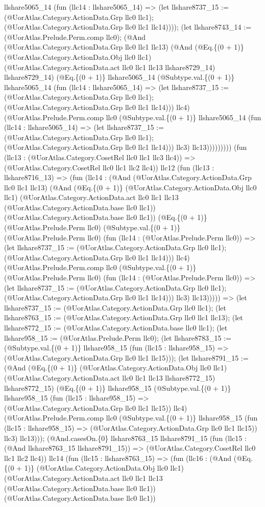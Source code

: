 \documentclass[11pt]{article}
\begin{document}
llshare5065\_14 (fun (llc14 : llshare5065\_14) => (let llshare8737\_15 := (@UorAtlas.Category.ActionData.Grp llc0 llc1); (@UorAtlas.Category.ActionData.Grp llc0 llc1 llc14)))); (let llshare8743\_14 := (@UorAtlas.Prelude.Perm.comp llc0); (@And (@UorAtlas.Category.ActionData.Grp llc0 llc1 llc13) (@And (@Eq.\{(0 + 1)\} (@UorAtlas.Category.ActionData.Obj llc0 llc1) (@UorAtlas.Category.ActionData.act llc0 llc1 llc13 llshare8729\_14) llshare8729\_14) (@Eq.\{(0 + 1)\} llshare5065\_14 (@Subtype.val.\{(0 + 1)\} llshare5065\_14 (fun (llc14 : llshare5065\_14) => (let llshare8737\_15 := (@UorAtlas.Category.ActionData.Grp llc0 llc1); (@UorAtlas.Category.ActionData.Grp llc0 llc1 llc14))) llc4) (@UorAtlas.Prelude.Perm.comp llc0 (@Subtype.val.\{(0 + 1)\} llshare5065\_14 (fun (llc14 : llshare5065\_14) => (let llshare8737\_15 := (@UorAtlas.Category.ActionData.Grp llc0 llc1); (@UorAtlas.Category.ActionData.Grp llc0 llc1 llc14))) llc3) llc13))))))))) (fun (llc13 : (@UorAtlas.Category.CosetRel llc0 llc1 llc3 llc4)) => (@UorAtlas.Category.CosetRel llc0 llc1 llc2 llc4)) llc12 (fun (llc13 : llshare8716\_13) => (fun (llc14 : (@And (@UorAtlas.Category.ActionData.Grp llc0 llc1 llc13) (@And (@Eq.\{(0 + 1)\} (@UorAtlas.Category.ActionData.Obj llc0 llc1) (@UorAtlas.Category.ActionData.act llc0 llc1 llc13 (@UorAtlas.Category.ActionData.base llc0 llc1)) (@UorAtlas.Category.ActionData.base llc0 llc1)) (@Eq.\{(0 + 1)\} (@UorAtlas.Prelude.Perm llc0) (@Subtype.val.\{(0 + 1)\} (@UorAtlas.Prelude.Perm llc0) (fun (llc14 : (@UorAtlas.Prelude.Perm llc0)) => (let llshare8737\_15 := (@UorAtlas.Category.ActionData.Grp llc0 llc1); (@UorAtlas.Category.ActionData.Grp llc0 llc1 llc14))) llc4) (@UorAtlas.Prelude.Perm.comp llc0 (@Subtype.val.\{(0 + 1)\} (@UorAtlas.Prelude.Perm llc0) (fun (llc14 : (@UorAtlas.Prelude.Perm llc0)) => (let llshare8737\_15 := (@UorAtlas.Category.ActionData.Grp llc0 llc1); (@UorAtlas.Category.ActionData.Grp llc0 llc1 llc14))) llc3) llc13))))) => (let llshare8737\_15 := (@UorAtlas.Category.ActionData.Grp llc0 llc1); (let llshare8763\_15 := (@UorAtlas.Category.ActionData.Grp llc0 llc1 llc13); (let llshare8772\_15 := (@UorAtlas.Category.ActionData.base llc0 llc1); (let llshare958\_15 := (@UorAtlas.Prelude.Perm llc0); (let llshare8783\_15 := (@Subtype.val.\{(0 + 1)\} llshare958\_15 (fun (llc15 : llshare958\_15) => (@UorAtlas.Category.ActionData.Grp llc0 llc1 llc15))); (let llshare8791\_15 := (@And (@Eq.\{(0 + 1)\} (@UorAtlas.Category.ActionData.Obj llc0 llc1) (@UorAtlas.Category.ActionData.act llc0 llc1 llc13 llshare8772\_15) llshare8772\_15) (@Eq.\{(0 + 1)\} llshare958\_15 (@Subtype.val.\{(0 + 1)\} llshare958\_15 (fun (llc15 : llshare958\_15) => (@UorAtlas.Category.ActionData.Grp llc0 llc1 llc15)) llc4) (@UorAtlas.Prelude.Perm.comp llc0 (@Subtype.val.\{(0 + 1)\} llshare958\_15 (fun (llc15 : llshare958\_15) => (@UorAtlas.Category.ActionData.Grp llc0 llc1 llc15)) llc3) llc13))); (@And.casesOn.\{0\} llshare8763\_15 llshare8791\_15 (fun (llc15 : (@And llshare8763\_15 llshare8791\_15)) => (@UorAtlas.Category.CosetRel llc0 llc1 llc2 llc4)) llc14 (fun (llc15 : llshare8763\_15) => (fun (llc16 : (@And (@Eq.\{(0 + 1)\} (@UorAtlas.Category.ActionData.Obj llc0 llc1) (@UorAtlas.Category.ActionData.act llc0 llc1 llc13 (@UorAtlas.Category.ActionData.base llc0 llc1)) (@UorAtlas.Category.ActionData.base llc0 llc1)) 
\end{document}
